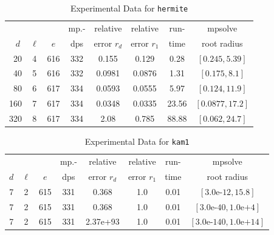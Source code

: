 \documentclass[runningheads]{llncs}
\begin{document}
\begin{table}
\caption{Experimental Data for \texttt{hermite}} %
\label{tab:hermite}
\vskip -0.15in
\begin{center}
\begin{small}
\begin{sc}
\begin{tabular}{rccccccc}
\toprule
&  &  & mp.-& relative  & relative & run- & mpsolve \\
$d~$& $\ell$& $e$ & dps&error $r_d$       & error $r_1$ &time& root radius\\
\midrule
 20 & 4 & 616 & 332 & 0.155 & 0.129 & 0.28 & $[0.245, 5.39]$\\
 40 & 5 & 616 & 332 & 0.0981 & 0.0876 & 1.31 & $[0.175, 8.1]$\\
 80 & 6 & 617 & 334 & 0.0593 & 0.0555 & 5.97 & $[0.124, 11.9]$\\
 160 & 7 & 617 & 334 & 0.0348 & 0.0335 & 23.56 & $[0.0877, 17.2]$\\
 320 & 8 & 617 & 334 & 2.08 & 0.785 & 88.88 & $[0.062, 24.7]$\\
\bottomrule
\end{tabular}
\end{sc}
\end{small}
\end{center}
\vskip 0.05in
\end{table}

\begin{table}
\caption{Experimental Data for \texttt{kam1}} %
\label{tab:kam1}
\vskip -0.15in
\begin{center}
\begin{small}
\begin{sc}
\begin{tabular}{rccccccc}
\toprule
&  &  & mp.-& relative  & relative & run- & mpsolve \\
$d$& $\ell$& $e$ & dps&error $r_d$       & error $r_1$ &time& root radius\\
\midrule
 7 & 2 & 615 & 331 & 0.368 & 1.0 & 0.01 & $[3.0\text{e-}12, 15.8]$\\
 7 & 2 & 615 & 331 & 0.368 & 1.0 & 0.01 & $[3.0\text{e-}40, 1.0\text{e+}4]$\\
 7 & 2 & 615 & 331 & 2.37e+93 & 1.0 & 0.01 & $[3.0\text{e-}140, 1.0\text{e+}14]$\\
\bottomrule
\end{tabular}
\end{sc}
\end{small}
\end{center}
\vskip 0.05in
\end{table}
\end{document}
